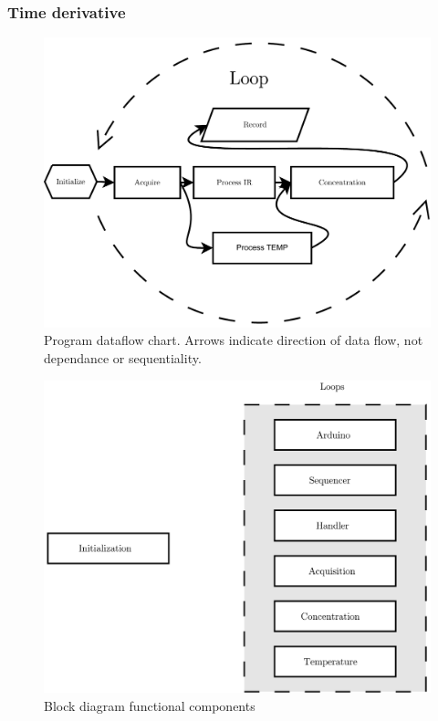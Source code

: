 \documentclass[a4paper,11pt]{article}
\begin{document}
\subsubsection{Time derivative}
\begin{figure}[htb]
  \includegraphics[width=\textwidth]{dataflow}
  \caption{Program dataflow chart. Arrows indicate direction of data flow,
    not dependance or sequentiality.}
  \label{fig:dataflow}
\end{figure}

\begin{figure}[htb]
  \includegraphics[width=\textwidth]{block-diagram-map}
  \caption{Block diagram functional components}
  \label{fig:block-diag-map}
\end{figure}
\end{document}
